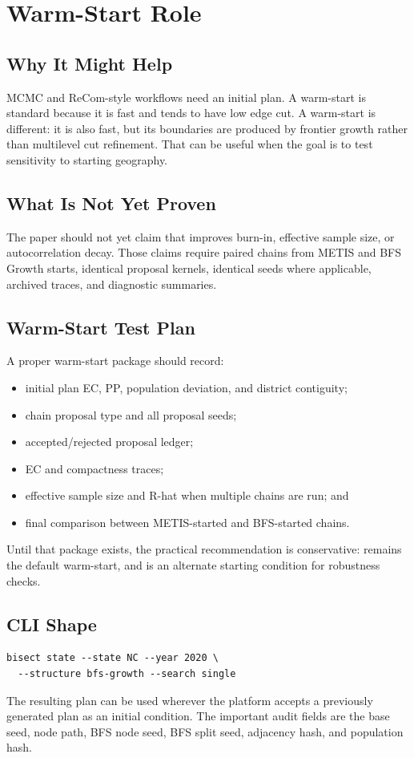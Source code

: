 \section{Warm-Start Role}
\label{sec:warmstart}

\subsection{Why It Might Help}

MCMC and ReCom-style workflows need an initial plan. A \metis{} warm-start is
standard because it is fast and tends to have low edge cut. A \bfsg{} warm-start
is different: it is also fast, but its boundaries are produced by frontier
growth rather than multilevel cut refinement. That can be useful when the goal
is to test sensitivity to starting geography.

\subsection{What Is Not Yet Proven}

The paper should not yet claim that \bfsg{} improves burn-in, effective sample
size, or autocorrelation decay. Those claims require paired chains from METIS
and BFS Growth starts, identical proposal kernels, identical seeds where
applicable, archived traces, and diagnostic summaries.

\subsection{Warm-Start Test Plan}

A proper warm-start package should record:
\begin{itemize}
\item initial plan EC, PP, population deviation, and district contiguity;
\item chain proposal type and all proposal seeds;
\item accepted/rejected proposal ledger;
\item EC and compactness traces;
\item effective sample size and R-hat when multiple chains are run; and
\item final comparison between METIS-started and BFS-started chains.
\end{itemize}

Until that package exists, the practical recommendation is conservative:
\metis{} remains the default warm-start, and \bfsg{} is an alternate starting
condition for robustness checks.

\subsection{CLI Shape}

\begin{verbatim}
bisect state --state NC --year 2020 \
  --structure bfs-growth --search single
\end{verbatim}

The resulting plan can be used wherever the platform accepts a previously
generated plan as an initial condition. The important audit fields are the base
seed, node path, BFS node seed, BFS split seed, adjacency hash, and population
hash.
